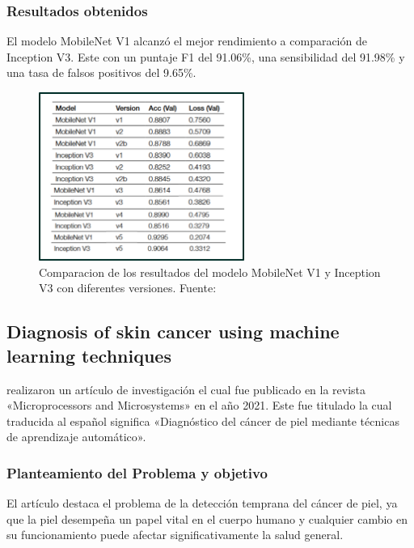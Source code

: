 \subsubsection{Resultados obtenidos}
El modelo MobileNet V1 alcanzó el mejor rendimiento a comparación de Inception V3. Este con un puntaje F1 del 91.06\%, una sensibilidad del 91.98\% y una tasa de falsos positivos del 9.65\%. 


\begin{figure}[h]
	\begin{center}
		\includegraphics[width=0.6\textwidth]{2/figuras/Design_tool_the_classification_imagen_01.png}
		\caption{Comparacion de los resultados del modelo MobileNet V1 y Inception V3 con diferentes versiones. Fuente: \cite{vargas_2021diseno}}
		\label{1:fig}
	\end{center}
\end{figure}





\subsection{Diagnosis of skin cancer using machine learning techniques \citep*{murugan_2021diagnosis}}

\citeauthor{murugan_2021diagnosis} realizaron un artículo de investigación el cual fue publicado en la revista «Microprocessors and Microsystems» en el año 2021. Este fue titulado  la cual traducida al español significa «Diagnóstico del cáncer de piel mediante técnicas de aprendizaje automático».



\subsubsection{Planteamiento del Problema y objetivo}
 El artículo destaca el problema de la detección temprana del cáncer de piel, ya que la piel desempeña un papel vital en el cuerpo humano y cualquier cambio en su funcionamiento puede afectar significativamente la salud general.

